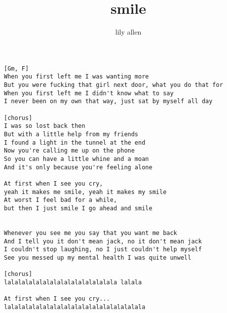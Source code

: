 \author{lily allen}
\title{smile}
\maketitle
\begin{verbatim}
[Gm, F]
When you first left me I was wanting more
But you were fucking that girl next door, what you do that for
When you first left me I didn't know what to say
I never been on my own that way, just sat by myself all day

[chorus]
I was so lost back then
But with a little help from my friends
I found a light in the tunnel at the end
Now you're calling me up on the phone
So you can have a little whine and a moan
And it's only because you're feeling alone

At first when I see you cry,
yeah it makes me smile, yeah it makes my smile
At worst I feel bad for a while,
but then I just smile I go ahead and smile


Whenever you see me you say that you want me back
And I tell you it don't mean jack, no it don't mean jack
I couldn't stop laughing, no I just couldn't help myself
See you messed up my mental health I was quite unwell

[chorus]
lalalalalalalalalalalalalalalala lalala

At first when I see you cry...
lalalalalalalalalalalalalalalalalalalala 

\end{verbatim}
